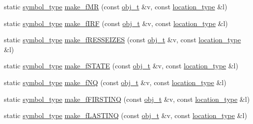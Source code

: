 \begin{DoxyCompactItemize}
\item 
static \hyperlink{classyy_1_1genesyspp__parser_a5b9a172d481d4a62555ee11a7957e789}{symbol\-\_\-type} \hyperlink{classyy_1_1genesyspp__parser_af59cc23a319d99fd636d3b3365000d25}{make\-\_\-f\-M\-R} (const \hyperlink{classobj__t}{obj\-\_\-t} \&v, const \hyperlink{classyy_1_1genesyspp__parser_aa0276d3782ebff157827ad5e7d44f97c}{location\-\_\-type} \&l)
\item 
static \hyperlink{classyy_1_1genesyspp__parser_a5b9a172d481d4a62555ee11a7957e789}{symbol\-\_\-type} \hyperlink{classyy_1_1genesyspp__parser_a99e50edbd3ae00055eb123c0141c2b71}{make\-\_\-f\-I\-R\-F} (const \hyperlink{classobj__t}{obj\-\_\-t} \&v, const \hyperlink{classyy_1_1genesyspp__parser_aa0276d3782ebff157827ad5e7d44f97c}{location\-\_\-type} \&l)
\item 
static \hyperlink{classyy_1_1genesyspp__parser_a5b9a172d481d4a62555ee11a7957e789}{symbol\-\_\-type} \hyperlink{classyy_1_1genesyspp__parser_a82008c51cf20d8417aa32e5987e385c1}{make\-\_\-f\-R\-E\-S\-S\-E\-I\-Z\-E\-S} (const \hyperlink{classobj__t}{obj\-\_\-t} \&v, const \hyperlink{classyy_1_1genesyspp__parser_aa0276d3782ebff157827ad5e7d44f97c}{location\-\_\-type} \&l)
\item 
static \hyperlink{classyy_1_1genesyspp__parser_a5b9a172d481d4a62555ee11a7957e789}{symbol\-\_\-type} \hyperlink{classyy_1_1genesyspp__parser_ac4d7a0c02d3e48e97c56b85db49becc2}{make\-\_\-f\-S\-T\-A\-T\-E} (const \hyperlink{classobj__t}{obj\-\_\-t} \&v, const \hyperlink{classyy_1_1genesyspp__parser_aa0276d3782ebff157827ad5e7d44f97c}{location\-\_\-type} \&l)
\item 
static \hyperlink{classyy_1_1genesyspp__parser_a5b9a172d481d4a62555ee11a7957e789}{symbol\-\_\-type} \hyperlink{classyy_1_1genesyspp__parser_afa87445140ecb2a52af2cac0ac1c4159}{make\-\_\-f\-N\-Q} (const \hyperlink{classobj__t}{obj\-\_\-t} \&v, const \hyperlink{classyy_1_1genesyspp__parser_aa0276d3782ebff157827ad5e7d44f97c}{location\-\_\-type} \&l)
\item 
static \hyperlink{classyy_1_1genesyspp__parser_a5b9a172d481d4a62555ee11a7957e789}{symbol\-\_\-type} \hyperlink{classyy_1_1genesyspp__parser_ad66640e1c6e38afaf003ffb98ec79a5c}{make\-\_\-f\-F\-I\-R\-S\-T\-I\-N\-Q} (const \hyperlink{classobj__t}{obj\-\_\-t} \&v, const \hyperlink{classyy_1_1genesyspp__parser_aa0276d3782ebff157827ad5e7d44f97c}{location\-\_\-type} \&l)
\item 
static \hyperlink{classyy_1_1genesyspp__parser_a5b9a172d481d4a62555ee11a7957e789}{symbol\-\_\-type} \hyperlink{classyy_1_1genesyspp__parser_a01eefb1ffeb2d1a7c9b06d7211c7072f}{make\-\_\-f\-L\-A\-S\-T\-I\-N\-Q} (const \hyperlink{classobj__t}{obj\-\_\-t} \&v, const \hyperlink{classyy_1_1genesyspp__parser_aa0276d3782ebff157827ad5e7d44f97c}{location\-\_\-type} \&l)

\end{DoxyCompactItemize}
